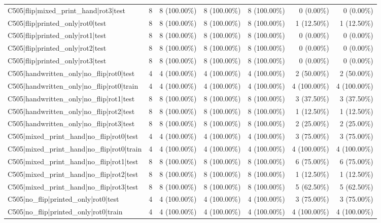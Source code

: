 \begin{longtable}{>{\raggedright\arraybackslash}p{5cm}rrrrrr}
C505|flip|mixed\_print\_hand|rot3|test & 8 & 8 (100.00\%) & 8 (100.00\%) & 8 (100.00\%) & 0 (0.00\%) & 0 (0.00\%) \\
C505|flip|printed\_only|rot0|test & 8 & 8 (100.00\%) & 8 (100.00\%) & 8 (100.00\%) & 1 (12.50\%) & 1 (12.50\%) \\
C505|flip|printed\_only|rot1|test & 8 & 8 (100.00\%) & 8 (100.00\%) & 8 (100.00\%) & 0 (0.00\%) & 0 (0.00\%) \\
C505|flip|printed\_only|rot2|test & 8 & 8 (100.00\%) & 8 (100.00\%) & 8 (100.00\%) & 0 (0.00\%) & 0 (0.00\%) \\
C505|flip|printed\_only|rot3|test & 8 & 8 (100.00\%) & 8 (100.00\%) & 8 (100.00\%) & 0 (0.00\%) & 0 (0.00\%) \\
C505|handwritten\_only|no\_flip|rot0|test & 4 & 4 (100.00\%) & 4 (100.00\%) & 4 (100.00\%) & 2 (50.00\%) & 2 (50.00\%) \\
C505|handwritten\_only|no\_flip|rot0|train & 4 & 4 (100.00\%) & 4 (100.00\%) & 4 (100.00\%) & 4 (100.00\%) & 4 (100.00\%) \\
C505|handwritten\_only|no\_flip|rot1|test & 8 & 8 (100.00\%) & 8 (100.00\%) & 8 (100.00\%) & 3 (37.50\%) & 3 (37.50\%) \\
C505|handwritten\_only|no\_flip|rot2|test & 8 & 8 (100.00\%) & 8 (100.00\%) & 8 (100.00\%) & 1 (12.50\%) & 1 (12.50\%) \\
C505|handwritten\_only|no\_flip|rot3|test & 8 & 8 (100.00\%) & 8 (100.00\%) & 8 (100.00\%) & 2 (25.00\%) & 2 (25.00\%) \\
C505|mixed\_print\_hand|no\_flip|rot0|test & 4 & 4 (100.00\%) & 4 (100.00\%) & 4 (100.00\%) & 3 (75.00\%) & 3 (75.00\%) \\
C505|mixed\_print\_hand|no\_flip|rot0|train & 4 & 4 (100.00\%) & 4 (100.00\%) & 4 (100.00\%) & 4 (100.00\%) & 4 (100.00\%) \\
C505|mixed\_print\_hand|no\_flip|rot1|test & 8 & 8 (100.00\%) & 8 (100.00\%) & 8 (100.00\%) & 6 (75.00\%) & 6 (75.00\%) \\
C505|mixed\_print\_hand|no\_flip|rot2|test & 8 & 8 (100.00\%) & 8 (100.00\%) & 8 (100.00\%) & 1 (12.50\%) & 1 (12.50\%) \\
C505|mixed\_print\_hand|no\_flip|rot3|test & 8 & 8 (100.00\%) & 8 (100.00\%) & 8 (100.00\%) & 5 (62.50\%) & 5 (62.50\%) \\
C505|no\_flip|printed\_only|rot0|test & 4 & 4 (100.00\%) & 4 (100.00\%) & 4 (100.00\%) & 3 (75.00\%) & 3 (75.00\%) \\
C505|no\_flip|printed\_only|rot0|train & 4 & 4 (100.00\%) & 4 (100.00\%) & 4 (100.00\%) & 4 (100.00\%) & 4 (100.00\%) \\

\end{longtable}
